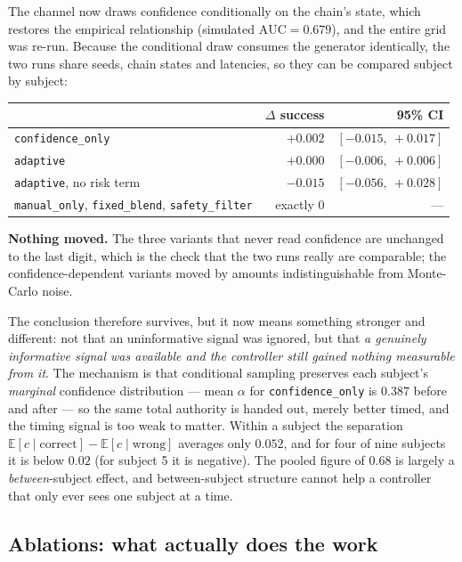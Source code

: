 \documentclass[11pt,a4paper]{article}
\newcommand{\vmanual}{\texttt{manual\_only}}
\newcommand{\vfixed}{\texttt{fixed\_blend}}
\newcommand{\vconf}{\texttt{confidence\_only}}
\newcommand{\vadapt}{\texttt{adaptive}}
\newcommand{\vsafety}{\texttt{safety\_filter}}
\theoremstyle{plain}
\theoremstyle{definition}
\begin{document}
The channel now draws confidence conditionally on the chain's state, which
restores the empirical relationship (simulated $\mathrm{AUC} = 0.679$),
and the entire grid was re-run. Because the conditional draw consumes the
generator identically, the two runs share seeds, chain states and
latencies, so they can be compared subject by subject:

\begin{center}
\small
\begin{tabular}{@{}lrr@{}}
\toprule
& $\Delta$ success & 95\% CI \\
\midrule
\vconf{}                 & $+0.002$ & $[-0.015,\ +0.017]$ \\
\vadapt{}                & $+0.000$ & $[-0.006,\ +0.006]$ \\
\vadapt{}, no risk term  & $-0.015$ & $[-0.056,\ +0.028]$ \\
\vmanual{}, \vfixed{}, \vsafety{} & exactly $0$ & --- \\
\bottomrule
\end{tabular}
\end{center}

\textbf{Nothing moved.} The three variants that never read confidence are
unchanged to the last digit, which is the check that the two runs really
are comparable; the confidence-dependent variants moved by amounts
indistinguishable from Monte-Carlo noise.

The conclusion therefore survives, but it now means something stronger and
different: not that an uninformative signal was ignored, but that
\emph{a genuinely informative signal was available and the controller
still gained nothing measurable from it}. The mechanism is that
conditional sampling preserves each subject's \emph{marginal} confidence
distribution --- mean $\alpha$ for \vconf{} is $0.387$ before and after ---
so the same total authority is handed out, merely better timed, and the
timing signal is too weak to matter. Within a subject the separation
$\mathbb{E}[c \mid \text{correct}] - \mathbb{E}[c \mid \text{wrong}]$
averages only $0.052$, and for four of nine subjects it is below $0.02$
(for subject 5 it is negative). The pooled figure of $0.68$ is largely a
\emph{between}-subject effect, and between-subject structure cannot help a
controller that only ever sees one subject at a time.

\subsection{Ablations: what actually does the work}
\label{sec:ablations}
\end{document}
